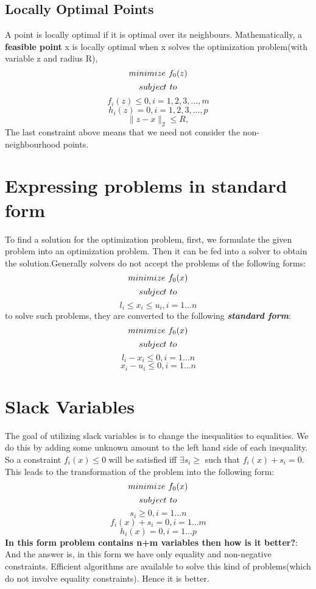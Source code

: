 \documentclass[twoside]{article}
\begin{document}
\subsection{Locally Optimal Points}
A point is locally optimal if it is optimal over its neighbours. Mathematically, a {\bf feasible point} x is locally optimal when x solves the optimization problem(with variable z and radius R),
\[minimize \hspace*{0.05in}f_0(z)\]
\[subject \hspace*{0.05in} to\]
\[f_i(z) \leq 0, i = 1,2,3,\ldots,m\]
\[h_i(z) = 0, i = 1,2,3,\ldots,p\]
\[\|z-x\|_2 \leq R,\]
The last constraint above means that we need not consider the non-neighbourhood points.
\section{Expressing problems in standard form}
\begin{text}
To find a solution for the optimization problem, first, we formulate the given problem into an optimization problem. Then it can be fed into a solver to obtain the solution.Generally solvers do not accept the problems of the following forms:
\[minimize\hspace*{0.05in}f_0(x)\]
\[subject \hspace*{0.05in}to\]
\[l_i \leq x_i \leq u_i, i = 1\ldots{n} \]
to solve such problems, they are converted to the following {\bf \it standard form}:\\
\[minimize\hspace*{0.05in}f_0(x)\]
\[subject \hspace*{0.05in}to\]
\[l_i - x_i \leq 0, i =1\ldots{n}\]
\[x_i - u_i \leq 0, i =1\ldots{n}\]
\end{text}

\section{Slack Variables}
The goal of utilizing slack variables is to change the inequalities to equalities. We do this by adding some unknown amount to the left hand side of each inequality. So a constraint \(f_i(x) \leq 0\) will be satisfied iff \(\exists s_i \geq \) such that \(f_i(x) + s_i = 0 \). This leads to the transformation of the problem into the following form:\\
\[minimize\hspace*{0.05in}f_0(x)\]
\[subject \hspace*{0.05in}to\]
\[s_i \geq 0, i = 1\ldots{n}\]
\[f_i(x) + s_i = 0, i = 1\ldots{m}\]
\[h_i(x) = 0, i = 1\ldots{p}\]
{\bf In this form problem contains n+m variables then how is it better?}: And the answer is, in this form we have only equality and non-negative constraints. Efficient algorithms are available to solve this kind of problems(which do not involve equality constraints). Hence it is better. 
\end{document}
